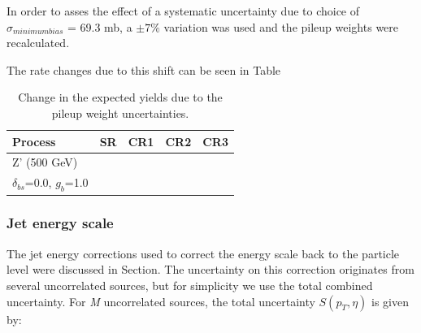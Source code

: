 In order to asses the effect of a systematic uncertainty due to choice of $\sigma_{minimum bias}$ = 69.3 mb, a $\pm 7\%$ variation was used and the pileup weights were recalculated.

The rate changes due to this shift can be seen in Table 

\begin{table}[hbtp]\footnotesize
	\centering
	\begin{tabular}{l l l l l}
		\hline
		\textbf{Process} & SR & CR1 & CR2 & CR3 \\
		\hline
		Z' (500 GeV) &  & & &  \\
		$\delta_{bs}$=0.0, $g_{b}$=1.0  &  & & &  \\
		\hline
	\end{tabular}
	\caption{Change in the expected yields due to the pileup weight uncertainties.}
	\label{tab:pu_rate}
\end{table}



\subsubsection{Jet energy scale}
The jet energy corrections used to correct the energy scale back to the particle level were discussed in Section. The uncertainty on this correction originates from several uncorrelated sources, but for simplicity we use the total combined uncertainty. For \textit{M} uncorrelated sources, the total uncertainty $S(p_{T},\eta)$ is given by:






